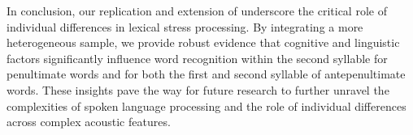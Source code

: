 In conclusion, our replication and extension of \cite{Sulpizio_McQueen_2012} underscore the critical role of individual differences in lexical stress processing. By integrating a more heterogeneous sample, we provide robust evidence that cognitive and linguistic factors significantly influence word recognition within the second syllable for penultimate words and for both the first and second syllable of antepenultimate words. These insights pave the way for future research to further unravel the complexities of spoken language processing and the role of individual differences across complex acoustic features.
